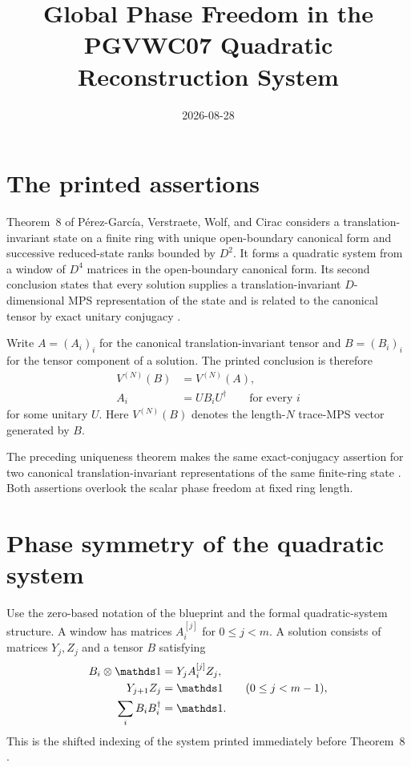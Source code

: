 \documentclass{article}
\title{Global Phase Freedom in the PGVWC07 Quadratic Reconstruction System}
\author{}
\date{2026-08-28}
\begin{document}
\maketitle
{}

\section{The printed assertions}

Theorem~8 of P\'erez-Garc\'ia, Verstraete, Wolf, and Cirac considers a
translation-invariant state on a finite ring with unique open-boundary
canonical form and successive reduced-state ranks bounded by $D^2$. It forms a
quadratic system from a window of $D^4$ matrices in the open-boundary canonical
form. Its second conclusion states that every solution supplies a
translation-invariant $D$-dimensional MPS representation of the state and is
related to the canonical tensor by exact unitary conjugacy
\cite[Theorem~8, lines~1154--1165]{PerezGarcia2007Matrix}.

Write $A=(A_i)_i$ for the canonical translation-invariant tensor and
$B=(B_i)_i$ for the tensor component of a solution. The printed conclusion is
therefore
\begin{align}
    V^{(N)}(B)
     & =V^{(N)}(A),
    \label{eq:pgvwc07_quadratic_reconstruction_phase_printed_state} \\
    A_i
     & =UB_iU^\dagger
    \qquad\text{for every }i
    \label{eq:pgvwc07_quadratic_reconstruction_phase_printed_conjugacy}
\end{align}
for some unitary $U$. Here $V^{(N)}(B)$ denotes the length-$N$ trace-MPS
vector generated by $B$.

The preceding uniqueness theorem makes the same exact-conjugacy assertion for
two canonical translation-invariant representations of the same finite-ring
state \cite[Theorem~7, lines~1002--1015]{PerezGarcia2007Matrix}. Both
assertions overlook the scalar phase freedom at fixed ring length.

\section{Phase symmetry of the quadratic system}

Use the zero-based notation of the blueprint and the formal quadratic-system
structure. A window has matrices $A_i^{[j]}$ for $0\leq j<m$. A solution
consists of matrices $Y_j,Z_j$ and a tensor $B$ satisfying
\begin{align}
    B_i\otimes\Id
     & =Y_jA_i^{[j]}Z_j,
    \label{eq:pgvwc07_quadratic_reconstruction_phase_system_gauge}   \\
    Y_{j+1}Z_j
     & =\Id
    \qquad(0\leq j<m-1),
    \label{eq:pgvwc07_quadratic_reconstruction_phase_system_inverse} \\
    \sum_iB_iB_i^\dagger
     & =\Id.
    \label{eq:pgvwc07_quadratic_reconstruction_phase_system_normalization}
\end{align}
This is the shifted indexing of the system printed immediately before
Theorem~8 \cite[lines~1142--1152]{PerezGarcia2007Matrix}.
\end{document}
